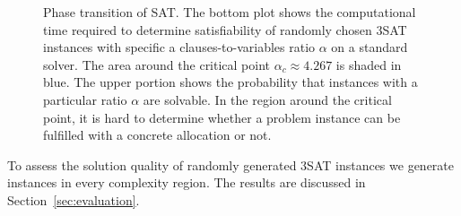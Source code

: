 \begin{figure}[t]
	\centering
	
	\caption{Phase transition of SAT. The bottom plot shows the computational time required to determine satisfiability of randomly chosen 3SAT instances with specific a clauses-to-variables ratio $\alpha$ on a standard solver. The area around the critical point $\alpha_{c} \approx 4.267$ is shaded in blue.\newline
          The upper portion shows the probability that instances with a particular ratio $\alpha$ are solvable. In the region around the critical point, it is hard to determine whether a problem instance can be fulfilled with a concrete allocation or not.} \label{fig:crit_sat} \end{figure}

To assess the solution quality of randomly generated 3SAT instances we generate instances in every complexity region. The results are discussed in Section~\ref{sec:evaluation}.

